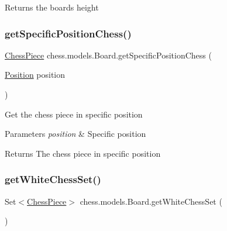\begin{DoxyReturn}{Returns}
the board\textquotesingle{}s height 
\end{DoxyReturn}
\mbox{\label{classchess_1_1models_1_1_board_a3e21ecd167f3c80dfd260e9acde208c6}} 
\subsubsection{\texorpdfstring{get\+Specific\+Position\+Chess()}{getSpecificPositionChess()}}
{\footnotesize\ttfamily \mbox{\hyperlink{classchess_1_1models_1_1_chess_piece}{Chess\+Piece}} chess.\+models.\+Board.\+get\+Specific\+Position\+Chess (\begin{DoxyParamCaption}\item[{\mbox{\hyperlink{classchess_1_1models_1_1_position}{Position}}}]{position }\end{DoxyParamCaption})}

Get the chess piece in specific position


\begin{DoxyParams}{Parameters}
{\em position} & Specific position \\
\hline
\end{DoxyParams}
\begin{DoxyReturn}{Returns}
The chess piece in specific position 
\end{DoxyReturn}
\mbox{\label{classchess_1_1models_1_1_board_a0fab147b0205caf586306a03e758e7bb}} 
\subsubsection{\texorpdfstring{get\+White\+Chess\+Set()}{getWhiteChessSet()}}
{\footnotesize\ttfamily Set$<$\mbox{\hyperlink{classchess_1_1models_1_1_chess_piece}{Chess\+Piece}}$>$ chess.\+models.\+Board.\+get\+White\+Chess\+Set (\begin{DoxyParamCaption}{ }\end{DoxyParamCaption})}

